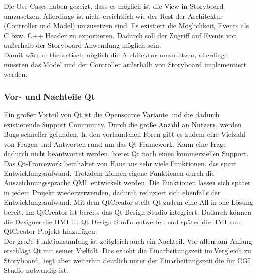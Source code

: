 Die Use Cases haben gezeigt, dass es möglich ist die View in Storyboard umzusetzen. Allerdings ist nicht ersichtlich wie der Rest der Architektur (Controller und Model) umzusetzen sind. Es existiert die Möglichkeit, Events als C bzw. C++ Header zu exportieren. Dadurch soll der Zugriff auf Events von außerhalb der Storyboard Anwendung möglich sein.\\

\newpage
Damit wäre es theoretisch möglich die Architektur umzusetzen, allerdings müssten das Model und der Controller außerhalb von Storyboard implementiert werden.\\
 

\subsubsection{Vor- und Nachteile Qt}

Ein großer Vorteil von Qt ist die Opensource Variante und die dadurch existierende Support Community. Durch die große Anzahl an Nutzern, werden Bugs schneller gefunden. In den vorhandenen Foren gibt es zudem eine Vielzahl von Fragen und Antworten rund um das Qt Framework. Kann eine Frage dadurch nicht beantwortet werden, bietet Qt noch einen kommerziellen Support. Das Qt-Framework beinhaltet von Haus aus sehr viele Funktionen, das spart Entwicklungsaufwand. Trotzdem können eigene Funktionen durch die Auszeichnungssprache QML entwickelt werden. Die Funktionen lassen sich später in jedem Projekt wiederverwenden, dadurch reduziert sich ebenfalls der Entwicklungsaufwand. Mit dem QtCreator stellt Qt zudem eine All-in-one Lösung bereit. Im QtCreator ist bereits das Qt Design Studio integriert. Dadurch können die Designer die \ac{HMI} im Qt Design Studio entwerfen und später die \ac{HMI} zum QtCreator Projekt hinzufügen.\\

Der große Funktionsumfang ist zeitgleich auch ein Nachteil. Vor allem am Anfang erschlägt Qt mit seiner Vielfalt. Das erhöht die Einarbeitungszeit im Vergleich zu Storyboard, liegt aber weiterhin deutlich unter der Einarbeitungszeit die für CGI Studio notwendig ist.\\

